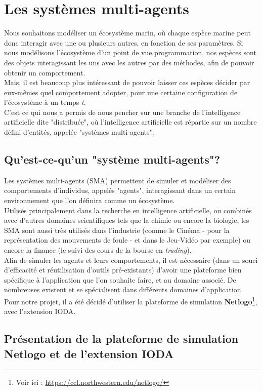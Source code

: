 \chapter{Les systèmes multi-agents}

Nous souhaitons modéliser un écosystème marin, où chaque espèce marine peut donc interagir avec une ou plusieurs autres, en fonction de ses paramètres. Si nous modélisons l'écosystème d'un point de vue programmation, nos espèces sont des objets interagissant les uns avec les autres par des méthodes, afin de pouvoir obtenir un comportement.
\\
Mais, il est beaucoup plus intéressant de pouvoir laisser ces espèces décider par eux-mêmes quel comportement adopter, pour une certaine configuration de l'écosystème à un temps \textit{t}.
\\
C'est ce qui nous a permis de nous pencher sur une branche de l'intelligence artificielle dite "distribuée", où l'intelligence artificielle est répartie sur un nombre défini d'entités, appelée "systèmes multi-agents".

\section{Qu'est-ce-qu'un "système multi-agents"?}

Les systèmes multi-agents (SMA) permettent de simuler et modéliser des comportements d'individus, appelés "agents", interagissant dans un certain environnement que l'on définira comme un écosystème\nocite{SMA}.
\\
Utilisés principalement dans la recherche en intelligence artificielle, ou combinés avec d'autres domaines scientifiques tels que la chimie ou encore la biologie, les SMA sont aussi très utilisés dans l'industrie (comme le Cinéma - pour la représentation des mouvements de foule - et dans le Jeu-Vidéo par exemple) ou encore la finance (le suivi des cours de la bourse en \textit{trading}).
\\
Afin de simuler les agents et leurs comportements, il est nécessaire (dans un souci d'efficacité et réutilisation d'outils pré-existants) d'avoir une plateforme bien spécifique à l'application que l'on souhaite faire, et au domaine associé. De nombreuses existent et se spécialisent dans différents domaines d'application. Pour notre projet, il a été décidé d'utiliser la plateforme de simulation \textbf{Netlogo}\footnote{Voir ici : \url{https://ccl.northwestern.edu/netlogo/}}, avec l'extension IODA.

\section{Présentation de la plateforme de simulation Netlogo et de l'extension IODA}

